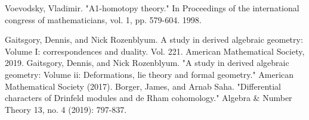 \documentclass[12pt]{article}
\theoremstyle{definition}
\begin{document}
\begin{thebibliography}{}
 Voevodsky, Vladimir. "A1-homotopy theory." In Proceedings of the international congress of mathematicians, vol. 1, pp. 579-604. 1998.

 Gaitsgory, Dennis, and Nick Rozenblyum. A study in derived algebraic geometry: Volume I: correspondences and duality. Vol. 221. American Mathematical Society, 2019.
 Gaitsgory, Dennis, and Nick Rozenblyum. "A study in derived algebraic geometry: Volume ii: Deformations, lie theory and formal geometry." American Mathematical Society (2017).
 Borger, James, and Arnab Saha. "Differential characters of Drinfeld modules and de Rham cohomology." Algebra \& Number Theory 13, no. 4 (2019): 797-837.



\end{thebibliography}
\end{document}
